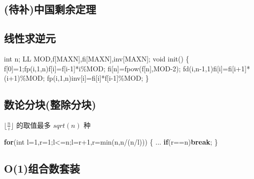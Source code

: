 \documentclass[
]{article}
\newenvironment{Shaded}{}{}
\newcommand{\ControlFlowTok}[1]{\textcolor[rgb]{0.00,0.44,0.13}{\textbf{#1}}}
\newcommand{\DataTypeTok}[1]{\textcolor[rgb]{0.56,0.13,0.00}{#1}}
\newcommand{\DecValTok}[1]{\textcolor[rgb]{0.25,0.63,0.44}{#1}}
\newcommand{\NormalTok}[1]{#1}
\begin{document}
\hypertarget{ux5f85ux8865ux4e2dux56fdux5269ux4f59ux5b9aux7406}{%
\subsection{(待补)中国剩余定理}\label{ux5f85ux8865ux4e2dux56fdux5269ux4f59ux5b9aux7406}}

\hypertarget{ux7ebfux6027ux6c42ux9006ux5143}{%
\subsection{线性求逆元}\label{ux7ebfux6027ux6c42ux9006ux5143}}

\begin{Shaded}
\begin{Highlighting}[]
\DataTypeTok{int}\NormalTok{ n;}
\NormalTok{LL MOD,f[MAXN],fi[MAXN],inv[MAXN];}
\DataTypeTok{void}\NormalTok{ init()}
\NormalTok{\{}
\NormalTok{    f[}\DecValTok{0}\NormalTok{]=}\DecValTok{1}\NormalTok{;fp(i,}\DecValTok{1}\NormalTok{,n)f[i]=f[i{-}}\DecValTok{1}\NormalTok{]*i\%MOD;}
\NormalTok{    fi[n]=fpow(f[n],MOD{-}}\DecValTok{2}\NormalTok{);}
\NormalTok{    fd(i,n{-}}\DecValTok{1}\NormalTok{,}\DecValTok{1}\NormalTok{)fi[i]=fi[i+}\DecValTok{1}\NormalTok{]*(i+}\DecValTok{1}\NormalTok{)\%MOD;}
\NormalTok{    fp(i,}\DecValTok{1}\NormalTok{,n)inv[i]=fi[i]*f[i{-}}\DecValTok{1}\NormalTok{]\%MOD;}
\NormalTok{\}}
\end{Highlighting}
\end{Shaded}

\hypertarget{ux6570ux8bbaux5206ux5757ux6574ux9664ux5206ux5757}{%
\subsection{数论分块(整除分块)}\label{ux6570ux8bbaux5206ux5757ux6574ux9664ux5206ux5757}}

\(\lfloor \frac{n}{i} \rfloor\) 的取值最多 \(sqrt(n)\) 种

\begin{Shaded}
\begin{Highlighting}[]
\ControlFlowTok{for}\NormalTok{(}\DataTypeTok{int}\NormalTok{ l=}\DecValTok{1}\NormalTok{,r=}\DecValTok{1}\NormalTok{;l\textless{}=n;l=r+}\DecValTok{1}\NormalTok{,r=min(n,n/(n/l)))}
\NormalTok{\{}
\NormalTok{    ...}
    \ControlFlowTok{if}\NormalTok{(r==n)}\ControlFlowTok{break}\NormalTok{;}
\NormalTok{\}}
\end{Highlighting}
\end{Shaded}

\hypertarget{o1ux7ec4ux5408ux6570ux5957ux88c5}{%
\subsection{O(1)组合数套装}\label{o1ux7ec4ux5408ux6570ux5957ux88c5}}
\end{document}
